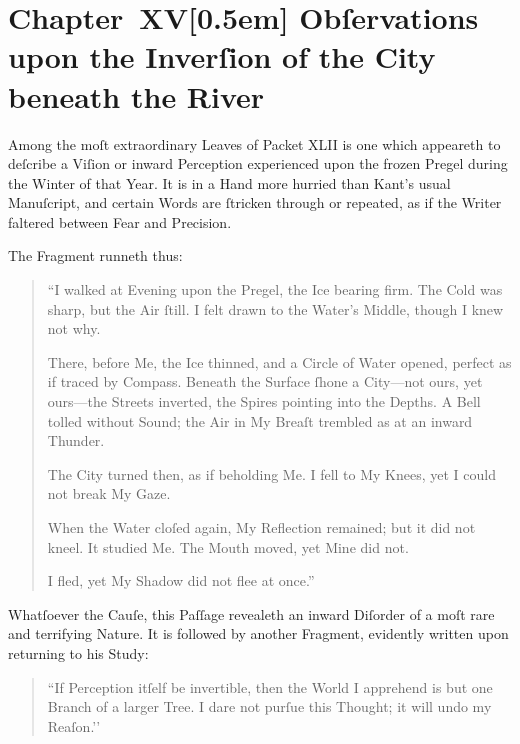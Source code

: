 \documentclass[12pt]{book}
\begin{document}

\chapter*{Chapter~XV[0.5em]
Obſervations upon the Inverſion of the City beneath the River}


Among the moſt extraordinary Leaves of Packet XLII is one which appeareth to deſcribe a Viſion or inward Perception experienced upon the frozen Pregel during the Winter of that Year. It is in a Hand more hurried than Kant's usual Manuſcript, and certain Words are ſtricken through or repeated, as if the Writer faltered between Fear and Precision.

The Fragment runneth thus:

\begin{quote}
``I walked at Evening upon the Pregel, the Ice bearing firm. The Cold was sharp, but the Air ſtill. I felt drawn to the Water's Middle, though I knew not why.

There, before Me, the Ice thinned, and a Circle of Water opened, perfect as if traced by Compass. Beneath the Surface ſhone a City—not ours, yet ours—the Streets inverted, the Spires pointing into the Depths. A Bell tolled without Sound; the Air in My Breaſt trembled as at an inward Thunder.

The City turned then, as if beholding Me. I fell to My Knees, yet I could not break My Gaze.

When the Water cloſed again, My Reflection remained; but it did not kneel. It studied Me. The Mouth moved, yet Mine did not.

I fled, yet My Shadow did not flee at once.''
\end{quote}

Whatſoever the Cauſe, this Paſſage revealeth an inward Diſorder of a moſt rare and terrifying Nature. It is followed by another Fragment, evidently written upon returning to his Study:

\begin{quote}
``If Perception itſelf be invertible, then the World I apprehend is but one Branch of a larger Tree. I dare not purſue this Thought; it will undo my Reaſon.’’
\end{quote}
\end{document}
